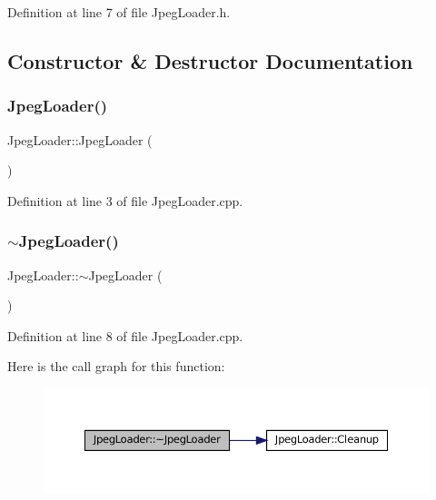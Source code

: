 Definition at line 7 of file Jpeg\+Loader.\+h.



\subsection{Constructor \& Destructor Documentation}
\mbox{\label{classJpegLoader_a9e61b80045d706af41e80fd28732b2b1}} 
\subsubsection{\texorpdfstring{JpegLoader()}{JpegLoader()}}
{\footnotesize\ttfamily Jpeg\+Loader\+::\+Jpeg\+Loader (\begin{DoxyParamCaption}{ }\end{DoxyParamCaption})}



Definition at line 3 of file Jpeg\+Loader.\+cpp.

\mbox{\label{classJpegLoader_a7c0a277d94089e1750efa7516fbeb503}} 
\subsubsection{\texorpdfstring{$\sim$JpegLoader()}{~JpegLoader()}}
{\footnotesize\ttfamily Jpeg\+Loader\+::$\sim$\+Jpeg\+Loader (\begin{DoxyParamCaption}{ }\end{DoxyParamCaption})}



Definition at line 8 of file Jpeg\+Loader.\+cpp.

Here is the call graph for this function\+:
\nopagebreak
\begin{figure}[H]
\begin{center}
\leavevmode
\includegraphics[width=350pt]{classJpegLoader_a7c0a277d94089e1750efa7516fbeb503_cgraph}
\end{center}
\end{figure}


